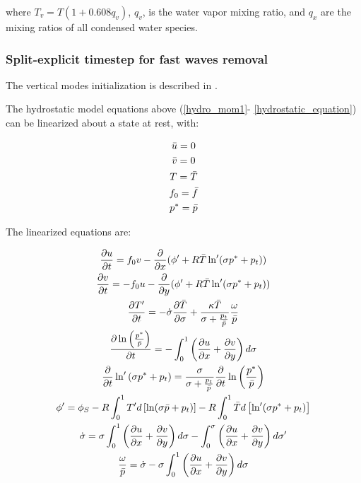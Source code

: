 where $T_v = T(1 + 0.608q_v)$, $q_v$, is the water vapor mixing ratio, and
$q_x$ are the mixing ratios of all condensed water species.

\subsubsection{Split-explicit timestep for fast waves removal}

The vertical modes initialization is  described in \cite{Errico_88}.

The hydrostatic model equations above (\ref{hydro_mom1}-
\ref{hydrostatic_equation}) can be linearized about a state at rest,
with:

\begin{gather}
\label{reference_atm}
  \bar{u} = 0 \nonumber \\
  \bar{v} = 0 \nonumber \\
  T = \bar{T} \nonumber \\
  f_0 = \bar{f} \nonumber \\
  p^{\ast} = \bar{p}
\end{gather}

The linearized equations are:

\begin{gather}
  \label{linearized}
  \frac{\partial u}{\partial t} =
       f_0 v - \frac{\partial}{\partial x} (\phi^{\prime} +
       R\bar{T}\ln^{\prime}(\sigma p^{\ast} + p_t)) \\
  \frac{\partial v}{\partial t} =
       - f_0 u - \frac{\partial}{\partial y} (\phi^{\prime} +
       R\bar{T}\ln^{\prime}(\sigma p^{\ast} + p_t)) \\
  \frac{\partial T^\prime}{\partial t} =
     - \dot{\sigma} \frac{\partial \bar{T}}{\partial \sigma} +
     \frac{\kappa \bar{T}}{\sigma + \frac{p_t}{\bar{p}}}
     \frac{\omega}{\bar{p}} \\
  \label{2111a}
  \frac{\partial \ln\left(\frac{p^{\ast}}{\bar{p}}\right)}{\partial t} =
  -\int_0^1\left(\frac{\partial u}{\partial x} +
  \frac{\partial v}{\partial y} \right) d\sigma \\
  \label{2111b}
  \frac{\partial}{\partial t} \ln^{\prime}\left(\sigma p^{\ast} +
     p_t\right) = \frac{\sigma}{\sigma+\frac{p_t}{\bar{p}}}
        \frac{\partial}{\partial t}
        \ln\left(\frac{p^{\ast}}{\bar{p}}\right) \\
  \phi^{\prime} = \phi_S - R \int_0^1 T^{\prime}
    d \left[ \ln(\sigma \bar{p}+p_t)\right] -
    R \int_0^1 \bar{T} d \left[ \ln^{\prime}
    (\sigma p^{\ast}+p_t) \right] \\
  \dot{\sigma} = \sigma \int_0^1 \left(\frac{\partial u}{\partial x} +
  \frac{\partial v}{\partial y} \right) d\sigma -
  \int_0^{\sigma} \left(\frac{\partial u}{\partial x} +
  \frac{\partial v}{\partial y}\right) d\sigma^{\prime} \\
  \label{last_linearized}
  \frac{\omega}{\bar{p}} = \dot{\sigma} - \sigma
  \int_0^1 \left(\frac{\partial u}{\partial x} +
  \frac{\partial v}{\partial y}\right) d\sigma
\end{gather}

